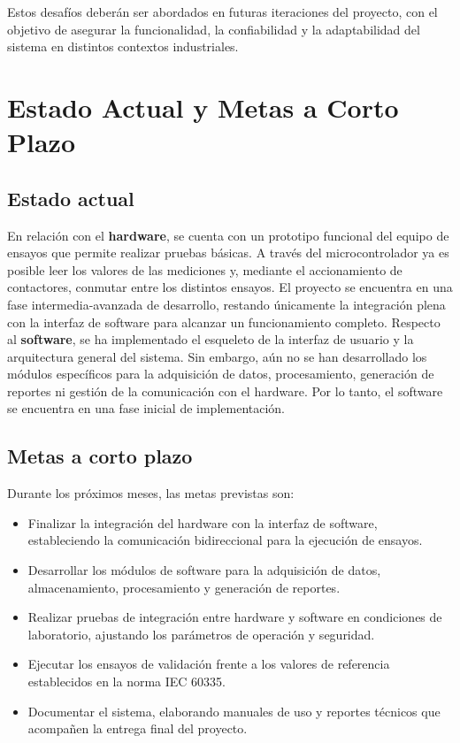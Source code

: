 \documentclass[a4paper,12pt]{article}
\begin{document}
\noindent Estos desafíos deberán ser abordados en futuras iteraciones del proyecto, con el objetivo de asegurar la funcionalidad, la confiabilidad y la adaptabilidad del sistema en distintos contextos industriales.


\section{Estado Actual y Metas a Corto Plazo}

\subsection{Estado actual}

En relación con el \textbf{hardware}, se cuenta con un prototipo funcional del equipo de ensayos que permite realizar pruebas básicas. A través del microcontrolador ya es posible leer los valores de las mediciones y, mediante el accionamiento de contactores, conmutar entre los distintos ensayos. El proyecto se encuentra en una fase intermedia-avanzada de desarrollo, restando únicamente la integración plena con la interfaz de software para alcanzar un funcionamiento completo.
\vspace{0.3cm}
\noindent  Respecto al \textbf{software}, se ha implementado el esqueleto de la interfaz de usuario y la arquitectura general del sistema. Sin embargo, aún no se han desarrollado los módulos específicos para la adquisición de datos, procesamiento, generación de reportes ni gestión de la comunicación con el hardware. Por lo tanto, el software se encuentra en una fase inicial de implementación.

\subsection{Metas a corto plazo}

Durante los próximos meses, las metas previstas son:

\begin{itemize}
    \item Finalizar la integración del hardware con la interfaz de software, estableciendo la comunicación bidireccional para la ejecución de ensayos.
    \item Desarrollar los módulos de software para la adquisición de datos, almacenamiento, procesamiento y generación de reportes.
    \item Realizar pruebas de integración entre hardware y software en condiciones de laboratorio, ajustando los parámetros de operación y seguridad.
    \item Ejecutar los ensayos de validación frente a los valores de referencia establecidos en la norma IEC 60335.
    \item Documentar el sistema, elaborando manuales de uso y reportes técnicos que acompañen la entrega final del proyecto.
\end{itemize}
\end{document}
